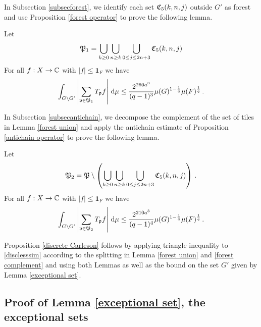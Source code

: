 {In Subsection \ref{subsecforest}, we identify each set $\mathfrak C_5(k,n,j)$ outside $G'$ as forest and use Proposition
\ref{forest operator} to prove the following lemma.

\begin{lemma}\label{forest union}
  Let
  \begin{equation}
      \mathfrak P_1 =\bigcup_{k\ge 0}\bigcup_{n\ge k}
      \bigcup_{0\le j\le 2n+3}\mathfrak C_5(k,n,j)
  \end{equation}
  For all $f:X\to \mathbb{C}$ with $|f|\le \mathbf{1}_F$ we have
\begin{equation}
    \label{disclesssim1}
    \int_{G \setminus  G'} \left|\sum_{\mathfrak p \in \mathfrak P_1} T_{\mathfrak p} f \right|\, \mathrm{d}\mu  \le \frac{2^{260a^3}}{(q-1)^3} \mu(G)^{1 - \frac{1}{q}} \mu(F)^{\frac{1}{q}}\,.
\end{equation}
\end{lemma}

In Subsection \ref{subsecantichain}, we decompose
the complement of the set of tiles in Lemma
\ref{forest union} and apply the antichain estimate of
Proposition \ref{antichain operator} to prove the following lemma.

\begin{lemma}\label{forest complement}
  Let
  \begin{equation}
      \mathfrak P_2 =\mathfrak P\setminus \left(\bigcup_{k\ge 0}\bigcup_{n\ge k}
      \bigcup_{0\le j\le 2n+3}\mathfrak C_5(k,n,j)\right)\,.
  \end{equation}
 For all $f:X\to \mathbb{C}$ with $|f|\le \mathbf{1}_F$ we have
\begin{equation}
    \label{disclesssim2}
    \int_{G \setminus  G'} \left|\sum_{\mathfrak p \in \mathfrak P_2} T_{\mathfrak p} f\right| \, \mathrm{d}\mu  \le \frac{2^{210a^3}}{(q-1)^4} \mu(G)^{1 - \frac{1}{q}} \mu(F)^{\frac{1}{q}}\,.
\end{equation}
\end{lemma}
Proposition \ref{discrete Carleson} follows by applying
triangle inequality to \eqref{disclesssim}
according to the splitting in Lemma \ref{forest union}
and \ref{forest complement} and using both Lemmas as well
as the bound on the set $G'$ given by Lemma \ref{exceptional set}.



\subsection{Proof of Lemma \ref{exceptional set}, the exceptional sets}
\label{subsetexcset}


}
